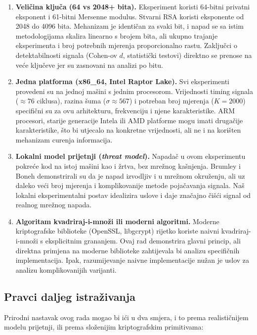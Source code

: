 \begin{enumerate}

\item \textbf{Veličina ključa (64 vs 2048+ bita).} Eksperiment koristi 64-bitni privatni eksponent i 61-bitni Mersenne modulus. Stvarni RSA koristi eksponente od 2048 do 4096 bita. Mehanizam je identičan za svaki bit, i napad se sa istim metodologijama skalira linearno s brojem bita, ali ukupno trajanje eksperimenta i broj potrebnih mjerenja proporcionalno rastu. Zaključci o detektabilnosti signala (Cohen-ov $d$, statistički testovi) direktno se prenose na veće ključeve jer su zasnovani na analizi po bitu.

\item \textbf{Jedna platforma (x86\_64, Intel Raptor Lake).} Svi eksperimenti provedeni su na jednoj mašini s jednim procesorom. Vrijednosti timing signala ($\approx 76$ ciklusa), razina šuma ($\sigma \approx 567$) i potreban broj mjerenja ($K = 2000$) specifični su za ovu arhitekturu, frekvenciju i njene karakteristike. ARM procesori, starije generacije Intela ili AMD platforme mogu imati drugačije karakteristike, što bi utjecalo na konkretne vrijednosti, ali ne i na korišten mehanizam curenja informacija.

\item \textbf{Lokalni model prijetnji (\textit{threat model}).} Napadač u ovom eksperimentu pokreće kod na istoj mašini kao i žrtva, bez mrežnog kašnjenja. Brumley i Boneh \cite{brumley2003} demonstrirali su da je napad izvodljiv i u mrežnom okruženju, ali uz daleko veći broj mjerenja i komplikovanije metode pojačavanja signala. Naš lokalni eksperimentalni postav idealizira uslove i daje značajno čišći signal od realnog mrežnog napada.

\item \textbf{Algoritam kvadriraj-i-množi ili moderni algoritmi.} Moderne kriptografske biblioteke (OpenSSL, libgcrypt) rijetko koriste naivni kvadriraj-i-množi s eksplicitnim grananjem. Ovaj rad demonstrira glavni princip, ali direktna primjena na moderne biblioteke zahtijevala bi analizu specifičnih implementacija. Ipak, razumijevanje naivne implementacije nužan je uslov za analizu komplikovanijih varijanti.

\end{enumerate}

\subsection{Pravci daljeg istraživanja}
Prirodni nastavak ovog rada mogao bi ići u dva smjera, i to prema realističnijem modelu prijetnji, ili prema složenijim kriptografskim primitivama:

